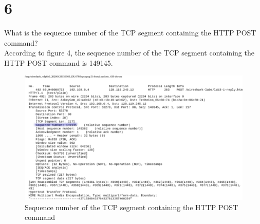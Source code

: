 \documentclass{article}
\begin{document}
\section*{6}
What is the sequence number of the TCP segment containing the HTTP POST
command?\\
\newline According to figure 4, the sequence number of the TCP segment containing the HTTP POST
command is 149145.\\
\begin{figure}[h!]
\centering
\includegraphics[scale=0.5]{Q6.pdf}
\caption{Sequence number of the TCP segment containing the HTTP POST
command}
\end{figure}
\end{document}
